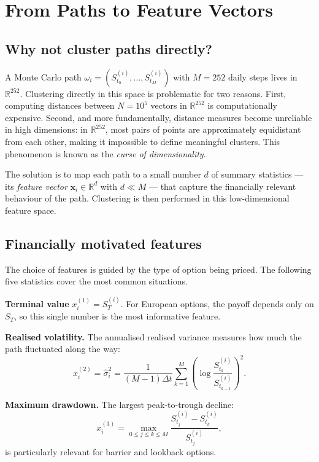 \documentclass[12pt, a4paper]{report}
\theoremstyle{definition}
\newcommand{\R}{\mathbb{R}}
\begin{document}
\section{From Paths to Feature Vectors}
\label{sec:features}

\subsection{Why not cluster paths directly?}

A Monte Carlo path
$\omega_i = (S_{t_0}^{(i)}, \ldots, S_{t_M}^{(i)})$ with $M = 252$
daily steps lives in $\R^{252}$.  Clustering directly in this space is
problematic for two reasons.  First, computing distances between
$N = 10^5$ vectors in $\R^{252}$ is computationally expensive.  Second,
and more fundamentally, distance measures become unreliable in high
dimensions: in $\R^{252}$, most pairs of points are approximately
equidistant from each other, making it impossible to define meaningful
clusters.  This phenomenon is known as the \emph{curse of
dimensionality}.

The solution is to map each path to a small number $d$ of summary
statistics --- its \emph{feature vector}
$\mathbf{x}_i \in \R^d$ with $d \ll M$ --- that capture the financially
relevant behaviour of the path.  Clustering is then performed in this
low-dimensional feature space.

\subsection{Financially motivated features}

The choice of features is guided by the type of option being priced.
The following five statistics cover the most common situations.

\textbf{Terminal value} $x_i^{(1)} = S_T^{(i)}$.  For European options,
the payoff depends only on $S_T$, so this single number is the most
informative feature.

\textbf{Realised volatility.}  The annualised realised variance measures
how much the path fluctuated along the way:
\begin{equation}
    x_i^{(2)} = \hat{\sigma}_i^2
    = \frac{1}{(M-1)\Delta t} \sum_{k=1}^{M}
    \left(\log\frac{S_{t_k}^{(i)}}{S_{t_{k-1}}^{(i)}}\right)^2.
    \label{eq:realised-vol}
\end{equation}

\textbf{Maximum drawdown.}  The largest peak-to-trough decline:
\begin{equation}
    x_i^{(3)} = \max_{0 \leq j \leq k \leq M}
    \frac{S_{t_j}^{(i)} - S_{t_k}^{(i)}}{S_{t_j}^{(i)}},
    \label{eq:max-drawdown}
\end{equation}
is particularly relevant for barrier and lookback options.
\end{document}
